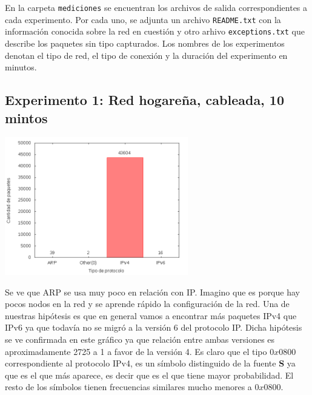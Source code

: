 En la carpeta \texttt{mediciones} se encuentran los archivos de salida correspondientes a cada
experimento. Por cada uno, se adjunta un archivo \texttt{README.txt} con la información conocida
sobre la red en cuestión y otro arhivo \texttt{exceptions.txt} que describe los paquetes sin tipo
capturados. Los nombres de los experimentos denotan el tipo de red, el tipo de conexión y la
duración del experimento en minutos.

\subsection{Experimento 1: Red hogareña, cableada, 10 mintos}

\begin{center}
\includegraphics[width=8cm]{../mediciones/home-eth-10/home-eth-10Protocolos.png}
\end{center}

Se ve que ARP se usa muy poco en relación con IP. Imagino que es porque hay pocos nodos en la red y se aprende rápido la configuración de la red.
Una de nuestras hipótesis es que en general vamos a encontrar más paquetes IPv4 que IPv6 ya que todavía no se migró a la versión 6 del protocolo IP.
Dicha hipótesis se ve confirmada en este gráfico ya que relación entre ambas versiones es aproximadamente 2725 a 1 a favor de la versión 4.
Es claro que el tipo $0x0800$ correspondiente al protocolo IPv4, es un símbolo distinguido de la fuente \textbf{S} ya que es el que más aparece,
es decir que es el que tiene mayor probabilidad. El resto de los símbolos tienen frecuencias similares mucho menores a $0x0800$.

